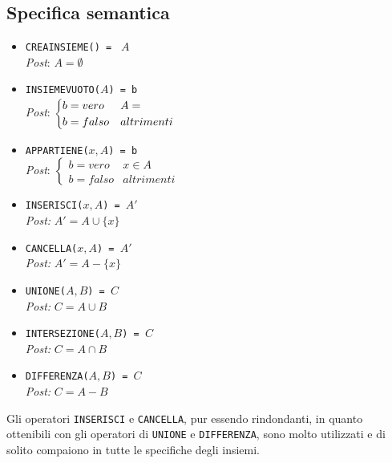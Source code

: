 \documentclass[12pt]{report}
\begin{document}
\subsection{Specifica semantica}
	\begin{itemize}
		\item \texttt{CREAINSIEME() = } $A$ \\
		\quad \textit{Post}: $A = \emptyset$
		\item \texttt{INSIEMEVUOTO($A$) = b} \\
		\quad \textit{Post}: $\begin{cases}
			b = vero & A = \empty \\
			b = falso & altrimenti
		\end{cases}$
		\item \texttt{APPARTIENE($x, A$) = b} \\
		\quad \textit{Post}: $\begin{cases}
			b = vero & x \in A \\
			b = falso & altrimenti
		\end{cases}$
		\item \texttt{INSERISCI($x, A$) = $A'$} \\
		\quad \textit{Post:} $A'= A \cup \{x\}$
		\item \texttt{CANCELLA($x, A$) = $A'$} \\
		\quad \textit{Post:} $A'= A - \{x\}$
		\item \texttt{UNIONE($A, B$) = $C$} \\
		\quad \textit{Post:} $C = A \cup B$
		\item \texttt{INTERSEZIONE($A, B$) = $C$} \\
		\quad \textit{Post:} $C = A \cap B$
		\item \texttt{DIFFERENZA($A, B$) = $C$} \\
		\quad \textit{Post:} $C = A - B$

	\end{itemize}
	Gli operatori \texttt{INSERISCI} e \texttt{CANCELLA}, pur essendo rindondanti, in quanto ottenibili con gli operatori di \texttt{UNIONE} e \texttt{DIFFERENZA}, sono molto utilizzati e di solito compaiono in tutte le specifiche degli insiemi.
\end{document}
